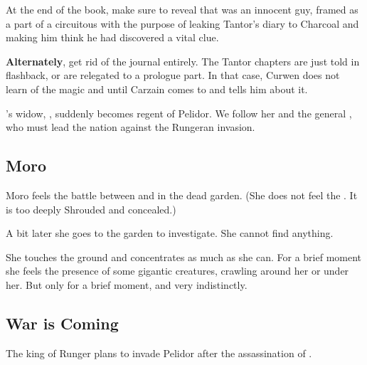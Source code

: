 At the end of the book, make sure to reveal that \Onatol was an innocent guy, framed as a part of a circuitous  with the purpose of leaking Tantor's diary to Charcoal and making him think he had discovered a vital clue. 

\textbf{Alternately}, get rid of the journal entirely.
The Tantor chapters are just told in flashback, or are relegated to a prologue part. 
In that case, Curwen does not learn of the magic and \Takestsha until Carzain comes to \Forclin and tells him about it.

\Icor's widow, \rinyuth[\Tiroco], suddenly becomes regent of Pelidor. 
We follow her and the general , who must lead the nation against the Rungeran invasion. 









\subsection{Moro \Cobrel}
Moro \Cobrel{} feels the battle between \Ishnaruchaefir{} and \Teshrial{} in the dead garden. 
(She does not feel the \noggyal. It is too deeply Shrouded and concealed.) 

A bit later she goes to the garden to investigate. 
She cannot find anything.

She touches the ground and concentrates as much as she can. 
For a brief moment she feels the presence of some gigantic creatures, crawling around her or under her. 
But only for a brief moment, and very indistinctly. 









\subsection{War is Coming}
The king of Runger plans to invade Pelidor after the assassination of \rayuth[\Icor]. 





